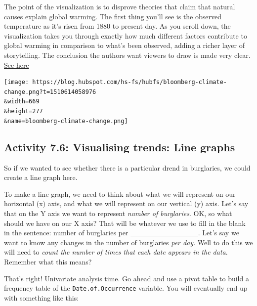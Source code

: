 \documentclass[
]{book}
\begin{document}
The point of the visualization is to disprove theories that claim that natural causes explain global warming. The first thing you'll see is the observed temperature as it's risen from 1880 to present day. As you scroll down, the visualization takes you through exactly how much different factors contribute to global warming in comparison to what's been observed, adding a richer layer of storytelling. The conclusion the authors want viewers to draw is made very clear. \href{http://www.bloomberg.com/graphics/2015-whats-warming-the-world/}{See here}

\texttt{[image: https://blog.hubspot.com/hs-fs/hubfs/bloomberg-climate-change.png?t=1510614058976\\\&width=669\\\&height=277\\\&name=bloomberg-climate-change.png]}

\hypertarget{activity-7.6-visualising-trends-line-graphs}{%
\subsection{Activity 7.6: Visualising trends: Line graphs}\label{activity-7.6-visualising-trends-line-graphs}}

So if we wanted to see whether there is a particular drend in burglaries, we could create a line graph here.

To make a line graph, we need to think about what we will represent on our horizontal (x) axis, and what we will represent on our vertical (y) axis. Let's say that on the Y axis we want to represent \emph{number of burglaries}. OK, so what should we have on our X axis? That will be whatever we use to fill in the blank in the sentence: number of burglaries per \_\_\_\_\_\_\_\_\_\_\_\_\_. Let's say we want to know any changes in the number of burglaries \emph{per day}. Well to do this we will need to \emph{count the number of times that each date appears in the data}. Remember what this means?

That's right! Univariate analysis time. Go ahead and use a pivot table to build a frequency table of the \texttt{Date.of.Occurrence} variable. You will eventually end up with something like this:
\end{document}
